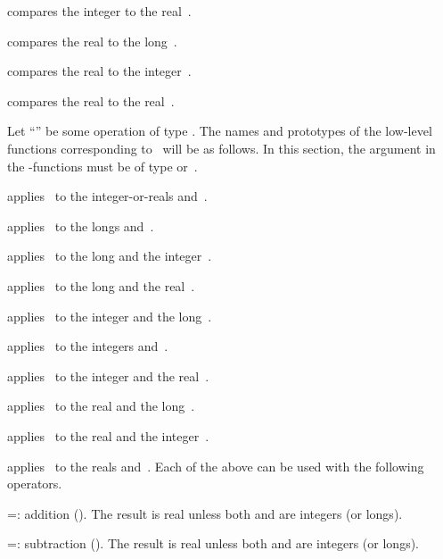 compares the integer  to the
real~.

 compares the real  to the
long~.

 compares the real  to the
integer~.

 compares the real  to the real~.


\noindent
Let ``\op'' be some operation of type . The names and
prototypes of the low-level functions corresponding to \op\ will be as follows.
In this section, the  argument in the -functions must be of type
 or~.

 applies \op\ to
the integer-or-reals  and~.

 applies \op\ to the longs
 and~.

 applies \op\ to the long 
and the integer~.

 applies \op\ to the long 
and the real~.

 applies \op\ to the
integer  and the long~.

 applies \op\ to the
integers  and~.

 applies \op\ to the
integer  and the real~.

 applies \op\ to the real 
and the long~.

 applies \op\ to the real 
and the integer~.

 applies \op\ to the reals 
and~.
\smallskip
\noindent Each of the above can be used with the following operators.

\op=: addition (). The result is real unless both 
and  are integers (or longs).

\op=: subtraction (). The result is real unless both
 and  are integers (or longs).

